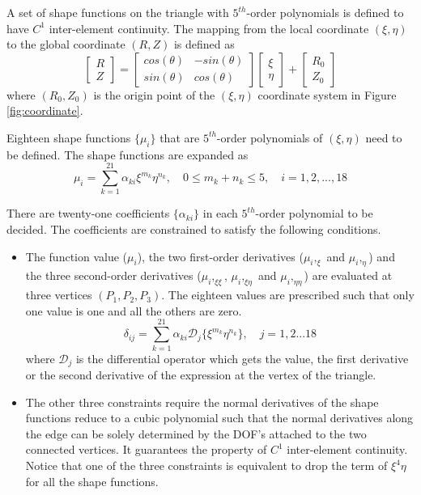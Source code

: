 \documentclass[11pt]{article}  %
\begin{document}
A set of shape functions on the triangle with $5^{th}$-order polynomials is defined to have $C^1$ inter-element continuity. 
The mapping from the local coordinate $(\xi, \eta)$ to the global coordinate $(R,Z)$ is defined as
\begin{equation} \label{mapping}
\left[ \begin{array}{c}
          R\\
          Z
        \end{array}
 \right]=\left[
        \begin{array}{cc}
          cos(\theta) & -sin(\theta) \\
          sin(\theta) & cos(\theta)
        \end{array}
        \right] \left[
        \begin{array}{c}
          \xi \\
          \eta
        \end{array}  \right] +\left[\begin{array}{c}
          R_0\\
          Z_0
        \end{array}
        \right]
\end{equation}
where $(R_0,Z_0)$ is the origin point of the $(\xi, \eta)$ coordinate system in Figure \ref{fig:coordinate}.

Eighteen shape functions $\{ \mu_i \}$ that are $5^{th}$-order polynomials of $(\xi,\eta)$  need to be defined. The shape functions are expanded as
\begin{equation} \label{basisfunction}
\mu_i=\sum_{k=1}^{21}\alpha_{ki}\xi^{m_k}\eta^{n_k}, \quad 0\leq m_k+n_k\leq5, \quad i=1,2,...,18
\end{equation}

There are twenty-one coefficients $\{\alpha_{ki}\}$ in each $5^{th}$-order polynomial to be decided.  The coefficients are constrained to satisfy the following conditions.
\begin{itemize}
\item The function value ($\mu_i$), the two first-order derivatives (${\mu_i,_\xi}$ and $\mu_i,_{\eta}$) and the three second-order derivatives ($\mu_i,_{\xi\xi}$, $\mu_i,_{\xi\eta}$ and $\mu_i,_{\eta\eta}$) are evaluated at three vertices $(P_1,P_2,P_3)$. The eighteen values are prescribed such that only one value is one and all the others are zero.
\begin{equation}
\delta_{ij}=\sum_{k=1}^{21}\alpha_{ki} \mathcal{D}_{j}\{\xi^{m_k}\eta^{n_k}\}, \quad j=1,2...18
\end{equation}
where $\mathcal{D}_{j}$ is the differential operator which gets the value, the first derivative or the second derivative of the expression at the vertex of the triangle. 
\item The other three constraints require the normal derivatives of the shape functions reduce to a cubic polynomial such that  the normal derivatives along the edge can be solely determined by the DOF's attached to the two connected vertices. It guarantees the property of $C^1$ inter-element continuity.  Notice that one of the three constraints is equivalent to drop the term of $\xi^4\eta$ for all the shape functions.
\end{itemize}
\end{document}
